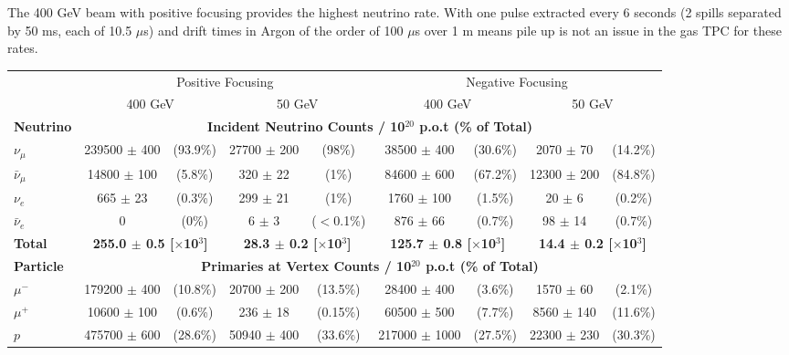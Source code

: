 The 400 GeV beam with positive focusing provides the highest neutrino rate. With one pulse extracted every 6 seconds (2 spills separated by 50 ms, each of 10.5 $\mu$s) and drift times in Argon of the order of 100 $\mu$s over 1 m means pile up is not an issue in the gas TPC for these rates.

\begin{table}
\centering
\begin{tabular}{| l ||cc|cc||cc|cc|}
	\hline
	 & \multicolumn{4}{|c||}{Positive Focusing} &  \multicolumn{4}{c|}{Negative Focusing} \\	 
	 \cline{2-9}
	  & \multicolumn{2}{|c|}{400 GeV} & \multicolumn{2}{c||}{50 GeV} & \multicolumn{2}{c|}{400 GeV} & \multicolumn{2}{c|}{50 GeV}  \\	 
	 \cline{2-9}
	 \textbf{Neutrino} & \multicolumn{8}{|c|}{\textbf{Incident Neutrino Counts / 10$^{20}$ p.o.t (\% of Total)}} \\	 
	 \cline{2-9}
	$\nu_{\mu}$ & 239500 $\pm$ 400 & (93.9\%)& 27700 $\pm$ 200 & (98\%)& 38500 $\pm$ 400 & (30.6\%)& 2070 $\pm$ 70 &(14.2\%)\\
	$\bar{\nu}_{\mu}$ & 14800 $\pm$ 100 & (5.8\%) & 320 $\pm$ 22 & (1\%)& 84600 $\pm$ 600 & (67.2\%)& 12300 $\pm$ 200 & (84.8\%)\\
	$\nu_{e}$ & 665 $\pm$ 23 & (0.3\%) & 299 $\pm$ 21 & (1\%) & 1760 $\pm$ 100 & (1.5\%) & 20 $\pm$ 6 & (0.2\%)\\
	$\bar{\nu}_{e}$ & 0  &(0\%)& 6 $\pm$ 3 & ($<$0.1\%)& 876 $\pm$ 66 & (0.7\%) & 98 $\pm$ 14 & (0.7\%)\\
	\hline
	\textbf{Total} & \multicolumn{2}{|c|}{\textbf{255.0 $\pm$ 0.5 [$\times$10$^{3}$]}} & \multicolumn{2}{|c||}{\textbf{28.3 $\pm$ 0.2 [$\times$10$^{3}$]}}& \multicolumn{2}{|c|}{\textbf{125.7 $\pm$ 0.8 [$\times$10$^{3}$]}} & \multicolumn{2}{|c|}{\textbf{14.4 $\pm$ 0.2 [$\times$10$^{3}$]}}\\
	 \hline
	 \hline	 
	 \cline{2-9}
	 \textbf{Particle} & \multicolumn{8}{|c|}{\textbf{Primaries at Vertex Counts / 10$^{20}$ p.o.t (\% of Total)}} \\
	 \cline{2-9}
	$\mu^{-}$ & 179200 $\pm$ 400 & (10.8\%) & 20700 $\pm$ 200 & (13.5\%) & 28400 $\pm$ 400 & (3.6\%) & 1570 $\pm$ 60& (2.1\%) \\
	$\mu^{+}$ & 10600 $\pm$ 100 &  (0.6\%) & 236 $\pm$ 18 & (0.15\%) & 60500 $\pm$ 500 & (7.7\%) & 8560 $\pm$ 140&  (11.6\%) \\
	$p$ & 475700 $\pm$ 600 & (28.6\%) & 50940 $\pm$ 400 & (33.6\%) &217000 $\pm$ 1000 & (27.5\%) & 22300 $\pm$ 230& (30.3\%) \\

\end{tabular}
\end{table}
